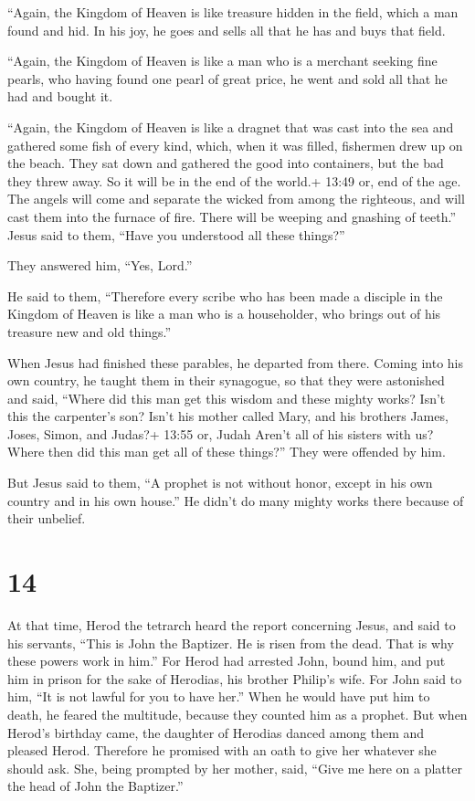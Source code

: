  ``Again, the Kingdom of Heaven is like treasure hidden in
the field, which a man found and hid. In his joy, he goes and sells all
that he has and buys that field.

 ``Again, the Kingdom of Heaven is like a man who is a
merchant seeking fine pearls,  who having found one pearl
of great price, he went and sold all that he had and bought it.

 ``Again, the Kingdom of Heaven is like a dragnet that was
cast into the sea and gathered some fish of every kind, 
which, when it was filled, fishermen drew up on the beach. They sat down
and gathered the good into containers, but the bad they threw away.
 So it will be in the end of the world.+ 13:49 or, end of
the age. The angels will come and separate the wicked from among the
righteous,  and will cast them into the furnace of fire.
There will be weeping and gnashing of teeth.''  Jesus said
to them, ``Have you understood all these things?''

They answered him, ``Yes, Lord.''

 He said to them, ``Therefore every scribe who has been
made a disciple in the Kingdom of Heaven is like a man who is a
householder, who brings out of his treasure new and old things.''

 When Jesus had finished these parables, he departed from
there.  Coming into his own country, he taught them in
their synagogue, so that they were astonished and said, ``Where did this
man get this wisdom and these mighty works?  Isn't this the
carpenter's son? Isn't his mother called Mary, and his brothers James,
Joses, Simon, and Judas?+ 13:55 or, Judah  Aren't all of
his sisters with us? Where then did this man get all of these things?''
 They were offended by him.

But Jesus said to them, ``A prophet is not without honor, except in his
own country and in his own house.''  He didn't do many
mighty works there because of their unbelief.

\hypertarget{section-13}{%
\section{14}\label{section-13}}

 At that time, Herod the tetrarch heard the report
concerning Jesus,  and said to his servants, ``This is John
the Baptizer. He is risen from the dead. That is why these powers work
in him.''  For Herod had arrested John, bound him, and put
him in prison for the sake of Herodias, his brother Philip's wife.
 For John said to him, ``It is not lawful for you to have
her.''  When he would have put him to death, he feared the
multitude, because they counted him as a prophet.  But when
Herod's birthday came, the daughter of Herodias danced among them and
pleased Herod.  Therefore he promised with an oath to give
her whatever she should ask.  She, being prompted by her
mother, said, ``Give me here on a platter the head of John the
Baptizer.''


